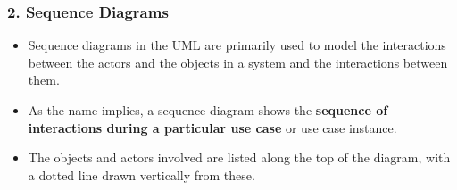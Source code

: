 \documentclass[xcolor=table]{beamer}
\begin{document}
\begin{frame}
    \frametitle{2. Sequence Diagrams}

    \begin{itemize}
        \item Sequence diagrams in the UML are primarily used to
model the interactions between the actors and the objects in a system and the interactions between them.
        \item As the name implies, a sequence diagram shows the
\textbf{sequence of interactions during a particular use case} or
use case instance.
        \item The objects and actors involved are listed along the top
of the diagram, with a dotted line drawn vertically from
these.
    \end{itemize}
    
    
    
\end{frame}
\end{document}
